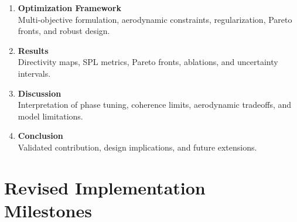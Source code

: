 \documentclass[11pt]{article}
\begin{document}
\begin{enumerate}
    \item \textbf{Optimization Framework}\\
    Multi-objective formulation, aerodynamic constraints, regularization, Pareto fronts, and robust design.

    \item \textbf{Results}\\
    Directivity maps, SPL metrics, Pareto fronts, ablations, and uncertainty intervals.

    \item \textbf{Discussion}\\
    Interpretation of phase tuning, coherence limits, aerodynamic tradeoffs, and model limitations.

    \item \textbf{Conclusion}\\
    Validated contribution, design implications, and future extensions.
\end{enumerate}

\section{Revised Implementation Milestones}
\end{document}
